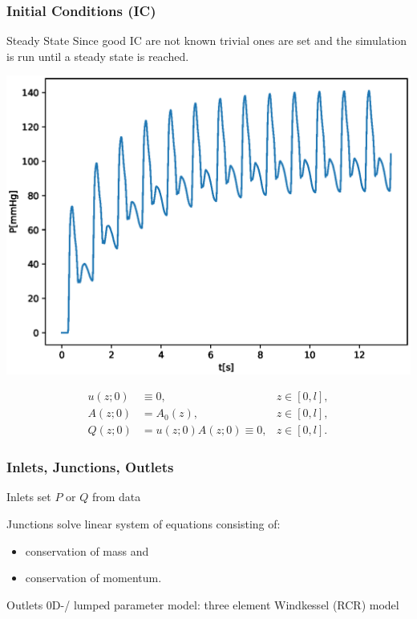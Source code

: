 \documentclass{beamer}
\begin{document}
	\begin{frame}
		\frametitle{Initial Conditions (IC)}
		\begin{center}
			\begin{minipage}{0.39\textwidth}
				\begin{block}{Steady State}
					Since good IC are not known trivial ones are set and the simulation is run until a steady state is reached.
				\end{block}

			\end{minipage}
			\begin{minipage}{0.59\textwidth}
				\includegraphics[width=\textwidth]{images/adan56_tibiofibular_trunk_L_P_steady_state.eps}
			\end{minipage}
			\hfill
			\begin{align}
				u(z;0) &\equiv 0, &z \in [0,l],\\
				A(z;0) &= A_0(z), &z \in [0,l], \\
				Q(z;0) &= u(z;0)A(z;0) \equiv 0, &z \in [0,l].
			\end{align}
		\end{center}
	\end{frame}
	\begin{frame}
		\frametitle{Inlets, Junctions, Outlets}
		\begin{block}{Inlets}
			set $P$ or $Q$ from data 	
		\end{block}
		\begin{block}{Junctions}
			solve linear system of equations consisting of:
			\begin{itemize}
				\item conservation of mass and
				\item conservation of momentum.
			\end{itemize}
		\end{block}
		\begin{block}{Outlets}
			0D-/ lumped parameter model: three element Windkessel (RCR) model 
		\end{block}
	\end{frame}
\end{document}
